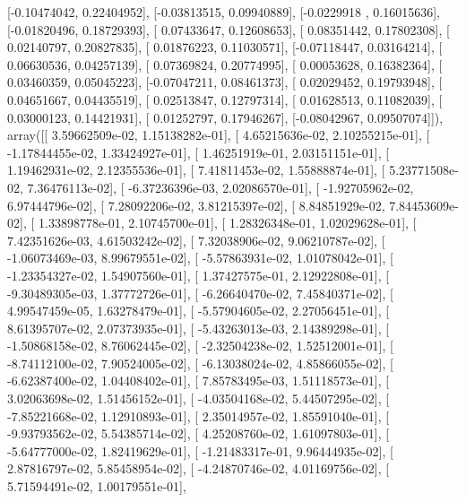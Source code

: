 \documentclass{article}
\begin{document}
       [-0.10474042,  0.22404952],
       [-0.03813515,  0.09940889],
       [-0.0229918 ,  0.16015636],
       [-0.01820496,  0.18729393],
       [ 0.07433647,  0.12608653],
       [ 0.08351442,  0.17802308],
       [ 0.02140797,  0.20827835],
       [ 0.01876223,  0.11030571],
       [-0.07118447,  0.03164214],
       [ 0.06630536,  0.04257139],
       [ 0.07369824,  0.20774995],
       [ 0.00053628,  0.16382364],
       [ 0.03460359,  0.05045223],
       [-0.07047211,  0.08461373],
       [ 0.02029452,  0.19793948],
       [ 0.04651667,  0.04435519],
       [ 0.02513847,  0.12797314],
       [ 0.01628513,  0.11082039],
       [ 0.03000123,  0.14421931],
       [ 0.01252797,  0.17946267],
       [-0.08042967,  0.09507074]]), array([[  3.59662509e-02,   1.15138282e-01],
       [  4.65215636e-02,   2.10255215e-01],
       [ -1.17844455e-02,   1.33424927e-01],
       [  1.46251919e-01,   2.03151151e-01],
       [  1.19462931e-02,   2.12355536e-01],
       [  7.41811453e-02,   1.55888874e-01],
       [  5.23771508e-02,   7.36476113e-02],
       [ -6.37236396e-03,   2.02086570e-01],
       [ -1.92705962e-02,   6.97444796e-02],
       [  7.28092206e-02,   3.81215397e-02],
       [  8.84851929e-02,   7.84453609e-02],
       [  1.33898778e-01,   2.10745700e-01],
       [  1.28326348e-01,   1.02029628e-01],
       [  7.42351626e-03,   4.61503242e-02],
       [  7.32038906e-02,   9.06210787e-02],
       [ -1.06073469e-03,   8.99679551e-02],
       [ -5.57863931e-02,   1.01078042e-01],
       [ -1.23354327e-02,   1.54907560e-01],
       [  1.37427575e-01,   2.12922808e-01],
       [ -9.30489305e-03,   1.37772726e-01],
       [ -6.26640470e-02,   7.45840371e-02],
       [  4.99547459e-05,   1.63278479e-01],
       [ -5.57904605e-02,   2.27056451e-01],
       [  8.61395707e-02,   2.07373935e-01],
       [ -5.43263013e-03,   2.14389298e-01],
       [ -1.50868158e-02,   8.76062445e-02],
       [ -2.32504238e-02,   1.52512001e-01],
       [ -8.74112100e-02,   7.90524005e-02],
       [ -6.13038024e-02,   4.85866055e-02],
       [ -6.62387400e-02,   1.04408402e-01],
       [  7.85783495e-03,   1.51118573e-01],
       [  3.02063698e-02,   1.51456152e-01],
       [ -4.03504168e-02,   5.44507295e-02],
       [ -7.85221668e-02,   1.12910893e-01],
       [  2.35014957e-02,   1.85591040e-01],
       [ -9.93793562e-02,   5.54385714e-02],
       [  4.25208760e-02,   1.61097803e-01],
       [ -5.64777000e-02,   1.82419629e-01],
       [ -1.21483317e-01,   9.96444935e-02],
       [  2.87816797e-02,   5.85458954e-02],
       [ -4.24870746e-02,   4.01169756e-02],
       [  5.71594491e-02,   1.00179551e-01],
\end{document}
